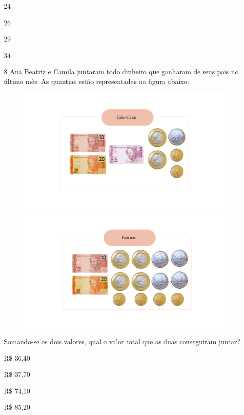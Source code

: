 \begin{minipage}{.5\textwidth}
\begin{escolha}
\item
  24
\item
  26
\item
  29
\item
  34
\end{escolha}
\end{minipage}

\num{8} Ana Beatriz e Camila juntaram todo dinheiro que ganharam de seus
pais no último mês. As quantias estão representadas na figura abaixo:

\begin{figure}[htpb!]
\includegraphics[width=.5\textwidth]{../ilustracoes/MAT5/SAEB_5ANO_MAT_figura114a.png}
\includegraphics[width=.5\textwidth]{../ilustracoes/MAT5/SAEB_5ANO_MAT_figura114b.png}
\end{figure}

Somando-se os dois valores, qual o valor total que as duas conseguiram
juntar?

\begin{minipage}{.5\textwidth}
\begin{escolha}
\item
  R\$ 36,40
\item
  R\$ 37,70
\item
  R\$ 74,10
\item
  R\$ 85,20
\end{escolha}
\end{minipage}

